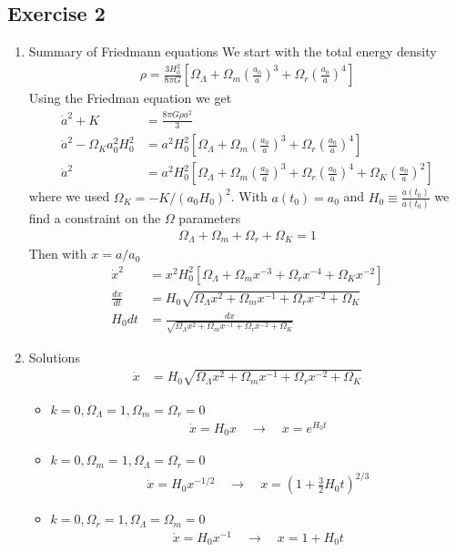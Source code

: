 \documentclass[10pt,a4paper]{book}
\theoremstyle{definition}
\begin{document}
\subsection{Exercise 2}
\begin{enumerate}
\item Summary of Friedmann equations
We start with the total energy density
\begin{align}
\rho=\frac{3H_0^2}{8\pi G}\left[
\Omega_\Lambda+
\Omega_m\left(\frac{a_0}{a}\right)^3+
\Omega_r\left(\frac{a_0}{a}\right)^4\right]
\end{align}
Using the Friedman equation we get
\begin{align}
\dot{a}^2+K
&=\frac{8\pi G\rho a^2}{3}\\
\dot{a}^2-\Omega_Ka_0^2H_0^2&=a^2H_0^2\left[
\Omega_\Lambda+
\Omega_m\left(\frac{a_0}{a}\right)^3+
\Omega_r\left(\frac{a_0}{a}\right)^4\right]\\
\dot{a}^2&=a^2H_0^2\left[
\Omega_\Lambda+
\Omega_m\left(\frac{a_0}{a}\right)^3+
\Omega_r\left(\frac{a_0}{a}\right)^4+
\Omega_K\left(\frac{a_0}{a}\right)^2\right]
\end{align}
where we used $\Omega_K=-K/(a_0H_0)^2$. With $a(t_0)=a_0$ and $H_0\equiv\frac{\dot{a}(t_0)}{a(t_0)}$ we find a constraint on the $\Omega$ parameters
\begin{align}
\Omega_\Lambda+\Omega_m+\Omega_r+\Omega_K=1
\end{align}
Then with $x=a/a_0$
\begin{align}
\dot{x}^2&=x^2H_0^2\left[
\Omega_\Lambda+
\Omega_m x^{-3}+
\Omega_r x^{-4}+
\Omega_K x^{-2}\right]\\
\frac{dx}{dt}&=H_0\sqrt{
\Omega_\Lambda x^2+
\Omega_m x^{-1}+
\Omega_r x^{-2}+
\Omega_K}\\
H_0dt&=
\frac{dx}{\sqrt{
\Omega_\Lambda x^2+
\Omega_m x^{-1}+
\Omega_r x^{-2}+
\Omega_K}}
\end{align}
\item Solutions
\begin{align}
\dot{x}&=H_0\sqrt{
\Omega_\Lambda x^2+
\Omega_m x^{-1}+
\Omega_r x^{-2}+
\Omega_K}
\end{align}
\begin{itemize}
\item $k=0, \Omega_\Lambda=1,\Omega_m=\Omega_r=0$
\begin{align}
\dot{x}=H_0x\quad\rightarrow\quad x=e^{H_0t}
\end{align}

\item $k=0, \Omega_m=1,\Omega_\Lambda=\Omega_r=0$
\begin{align}
\dot{x}=H_0x^{-1/2}\quad\rightarrow\quad x=\left(1+\frac{3}{2}H_0t\right)^{2/3}
\end{align}

\item $k=0, \Omega_r=1,\Omega_\Lambda=\Omega_m=0$
\begin{align}
\dot{x}=H_0x^{-1}\quad\rightarrow\quad x=1+H_0t
\end{align}


\end{itemize}
\end{enumerate}
\newpage
\end{document}
